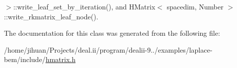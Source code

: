 $>$\+::write\+\_\+leaf\+\_\+set\+\_\+by\+\_\+iteration(), and H\+Matrix$<$ spacedim, Number $>$\+::write\+\_\+rkmatrix\+\_\+leaf\+\_\+node().



The documentation for this class was generated from the following file\+:\begin{DoxyCompactItemize}
\item 
/home/jihuan/\+Projects/deal.\+ii/program/dealii-\/9../examples/laplace-\/bem/include/\hyperlink{hmatrix_8h}{hmatrix.\+h}\end{DoxyCompactItemize}
